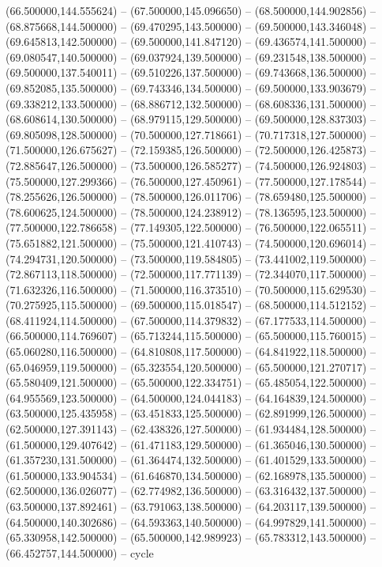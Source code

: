    (66.500000,144.555624) -- (67.500000,145.096650) -- (68.500000,144.902856) -- (68.875668,144.500000) -- (69.470295,143.500000) -- (69.500000,143.346048) -- (69.645813,142.500000) -- (69.500000,141.847120) -- (69.436574,141.500000) -- (69.080547,140.500000) -- (69.037924,139.500000) -- (69.231548,138.500000) -- (69.500000,137.540011) -- (69.510226,137.500000) -- (69.743668,136.500000) -- (69.852085,135.500000) -- (69.743346,134.500000) -- (69.500000,133.903679) -- (69.338212,133.500000) -- (68.886712,132.500000) -- (68.608336,131.500000) -- (68.608614,130.500000) -- (68.979115,129.500000) -- (69.500000,128.837303) -- (69.805098,128.500000) -- (70.500000,127.718661) -- (70.717318,127.500000) -- (71.500000,126.675627) -- (72.159385,126.500000) -- (72.500000,126.425873) -- (72.885647,126.500000) -- (73.500000,126.585277) -- (74.500000,126.924803) -- (75.500000,127.299366) -- (76.500000,127.450961) -- (77.500000,127.178544) -- (78.255626,126.500000) -- (78.500000,126.011706) -- (78.659480,125.500000) -- (78.600625,124.500000) -- (78.500000,124.238912) -- (78.136595,123.500000) -- (77.500000,122.786658) -- (77.149305,122.500000) -- (76.500000,122.065511) -- (75.651882,121.500000) -- (75.500000,121.410743) -- (74.500000,120.696014) -- (74.294731,120.500000) -- (73.500000,119.584805) -- (73.441002,119.500000) -- (72.867113,118.500000) -- (72.500000,117.771139) -- (72.344070,117.500000) -- (71.632326,116.500000) -- (71.500000,116.373510) -- (70.500000,115.629530) -- (70.275925,115.500000) -- (69.500000,115.018547) -- (68.500000,114.512152) -- (68.411924,114.500000) -- (67.500000,114.379832) -- (67.177533,114.500000) -- (66.500000,114.769607) -- (65.713244,115.500000) -- (65.500000,115.760015) -- (65.060280,116.500000) -- (64.810808,117.500000) -- (64.841922,118.500000) -- (65.046959,119.500000) -- (65.323554,120.500000) -- (65.500000,121.270717) -- (65.580409,121.500000) -- (65.500000,122.334751) -- (65.485054,122.500000) -- (64.955569,123.500000) -- (64.500000,124.044183) -- (64.164839,124.500000) -- (63.500000,125.435958) -- (63.451833,125.500000) -- (62.891999,126.500000) -- (62.500000,127.391143) -- (62.438326,127.500000) -- (61.934484,128.500000) -- (61.500000,129.407642) -- (61.471183,129.500000) -- (61.365046,130.500000) -- (61.357230,131.500000) -- (61.364474,132.500000) -- (61.401529,133.500000) -- (61.500000,133.904534) -- (61.646870,134.500000) -- (62.168978,135.500000) -- (62.500000,136.026077) -- (62.774982,136.500000) -- (63.316432,137.500000) -- (63.500000,137.892461) -- (63.791063,138.500000) -- (64.203117,139.500000) -- (64.500000,140.302686) -- (64.593363,140.500000) -- (64.997829,141.500000) -- (65.330958,142.500000) -- (65.500000,142.989923) -- (65.783312,143.500000) -- (66.452757,144.500000) -- cycle
